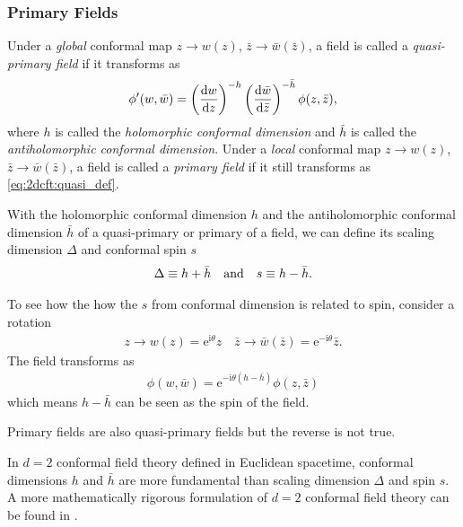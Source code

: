 \documentclass[10pt]{article}
\newcommand{\me}{\mathrm{e}}
\newcommand{\ii}{\mathrm{i}}
\begin{document}
\subsubsection{Primary Fields}
\begin{definition}
    Under a \textit{global} conformal map $z\to w(z)$, $\bar{z}\to \bar{w}(\bar{z})$, a field is called a \textit{quasi-primary field} if it transforms as
    \begin{align}
        \phi'(w,\bar{w})=\left(\dv{w}{z}\right)^{-h}\left(\dv{\bar{w}}{\bar{z}}\right)^{-\bar{h}}\phi(z,\bar{z}),\label{eq:2dcft:quasi_def}
    \end{align}
    where $h$ is called the \textit{holomorphic conformal dimension} and $\bar{h}$ is called the \textit{antiholomorphic conformal dimension}.
    Under a \textit{local} conformal map $z\to w(z)$, $\bar{z}\to \bar{w}(\bar{z})$, a field is called a \textit{primary field} if it still transforms as \cref{eq:2dcft:quasi_def}.
\end{definition}
With the holomorphic conformal dimension $h$ and the antiholomorphic conformal dimension $\bar{h}$ of a quasi-primary or primary of a field, we can define its scaling dimension $\Delta$ and conformal spin $s$
\begin{align}
    \Delta\equiv h+\bar{h}\qand s\equiv h-\bar{h}.\label{eq:holomorphic_conformal_dimension}
\end{align}
\begin{intu}
    To see how the how the $s$ from conformal dimension is related to spin, consider a rotation
    \begin{align}
        z\to w(z)=\me^{\ii\theta}z\quad\bar{z}\to\bar{w}(\bar{z})=\me^{-\ii\theta}\bar{z}.
    \end{align}
    The field transforms as
    \begin{align}
        \phi(w,\bar{w})=\me^{-\ii\theta(h-\bar{h})}\phi(z,\bar{z})
    \end{align}
    which means $h-\bar{h}$ can be seen as the spin of the field.
\end{intu}
\begin{remark}
    Primary fields are also quasi-primary fields but the reverse is not true.
    
    In $d=2$ conformal field theory defined in Euclidean spacetime, conformal dimensions $h$ and $\bar{h}$ are more fundamental than scaling dimension $\Delta$ and spin $s$.
    A more mathematically rigorous formulation of $d=2$ conformal field theory can be found in \cite{Schottenloher:2008zz}.
\end{remark}
\end{document}
